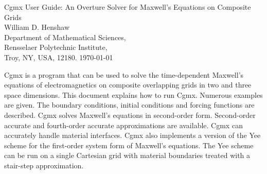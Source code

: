 \documentclass{article}
\begin{document}


\def\ud     {{    U}}
\def\pd     {{    P}}

\newcommand{\mbar}{\bar{m}}
\newcommand{\Rbar}{\bar{R}}
\newcommand{\Ru}{R_u}         %
\newcommand{\Div}{\grad\cdot}
\newcommand{\tauv}{\boldsymbol{\tau}}
\newcommand{\sumi}{\sum_{i=1}^n}
\newcommand{\dt}{{\Delta t}}
\newcommand{\eps}{\epsilon}

\baselineskip
\begin{flushleft}
{\Large
Cgmx User Guide: An Overture Solver for Maxwell's Equations on Composite Grids \\
}
\vspace{2\baselineskip}
William D. Henshaw  \\
Department of Mathematical Sciences, \\
Rensselaer Polytechnic Institute, \\
Troy, NY, USA, 12180.
\vspace{\baselineskip}
\today\\
\vspace{\baselineskip}

\vspace{4\baselineskip}


Cgmx is a program that can be used to solve the time-dependent Maxwell's equations
of electromagnetics on composite overlapping grids in two and three space
dimensions. This document explains how to run Cgmx. Numerous examples are
given. The boundary conditions, initial conditions and forcing functions 
are described.
Cgmx solves Maxwell's equations in second-order form. Second-order
accurate and fourth-order accurate approximations are available. Cgmx can
accurately handle material interfaces.  Cgmx also implements a version of the
Yee scheme for the first-order system form of Maxwell's equations. The Yee
scheme can be run on a single Cartesian grid with material boundaries treated
with a stair-step approximation.

\end{flushleft}
\end{document}
